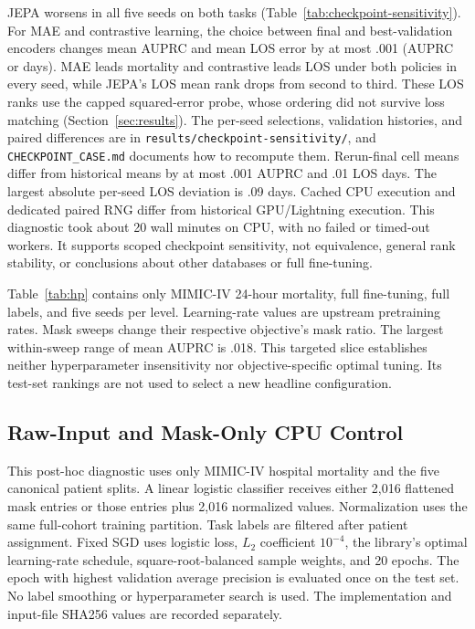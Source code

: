 JEPA worsens in all five seeds on both tasks (Table~\ref{tab:checkpoint-sensitivity}). For MAE and contrastive learning, the choice between final and best-validation encoders changes mean AUPRC and mean LOS error by at most .001 (AUPRC or days). MAE leads mortality and contrastive leads LOS under both policies in every seed, while JEPA's LOS mean rank drops from second to third. These LOS ranks use the capped squared-error probe, whose ordering did not survive loss matching (Section~\ref{sec:results}). The per-seed selections, validation histories, and paired differences are in \texttt{results/checkpoint-sensitivity/}, and \texttt{CHECKPOINT\_CASE.md} documents how to recompute them. Rerun-final cell means differ from historical means by at most .001 AUPRC and .01 LOS days. The largest absolute per-seed LOS deviation is .09 days. Cached CPU execution and dedicated paired RNG differ from historical GPU/Lightning execution. This diagnostic took about 20 wall minutes on CPU, with no failed or timed-out workers. It supports scoped checkpoint sensitivity, not equivalence, general rank stability, or conclusions about other databases or full fine-tuning.

Table~\ref{tab:hp} contains only MIMIC-IV 24-hour mortality, full fine-tuning, full labels, and five seeds per level. Learning-rate values are upstream pretraining rates. Mask sweeps change their respective objective's mask ratio. The largest within-sweep range of mean AUPRC is .018. This targeted slice establishes neither hyperparameter insensitivity nor objective-specific optimal tuning. Its test-set rankings are not used to select a new headline configuration.

\begin{table}[htbp]
{\scriptsize}
\end{table}

\subsection{Raw-Input and Mask-Only CPU Control}
\label{app:raw}

This post-hoc diagnostic uses only MIMIC-IV hospital mortality and the five canonical patient splits. A linear logistic classifier receives either 2,016 flattened mask entries or those entries plus 2,016 normalized values. Normalization uses the same full-cohort training partition. Task labels are filtered after patient assignment. Fixed SGD uses logistic loss, $L_2$ coefficient $10^{-4}$, the library's optimal learning-rate schedule, square-root-balanced sample weights, and 20 epochs. The epoch with highest validation average precision is evaluated once on the test set. No label smoothing or hyperparameter search is used. The implementation and input-file SHA256 values are recorded separately.

